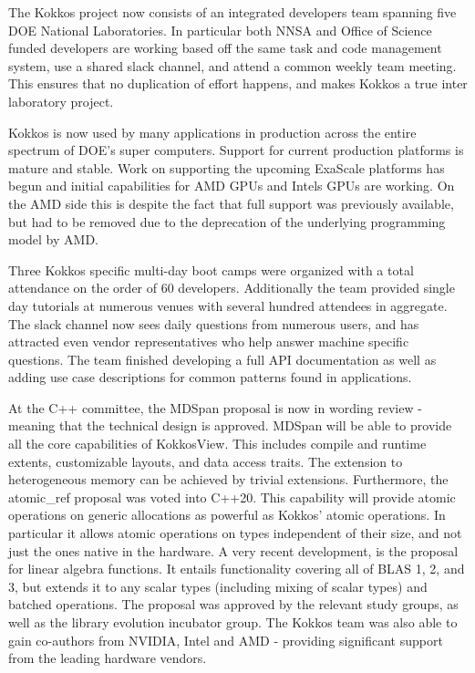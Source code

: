 The Kokkos project now consists of an integrated developers team spanning five DOE National Laboratories.
In particular both NNSA and Office of Science funded developers are working based off the same task and code management system, use a shared slack channel, and attend a common weekly team meeting.
This ensures that no duplication of effort happens, and makes Kokkos a true inter laboratory project.

Kokkos is now used by many applications in production across the entire spectrum of DOE's super computers.
Support for current production platforms is mature and stable.
Work on supporting the upcoming ExaScale platforms has begun and initial capabilities for AMD GPUs and Intels GPUs are working.
On the AMD side this is despite the fact that full support was previously available, but had to be removed due to the deprecation of the underlying programming model by AMD.

Three Kokkos specific multi-day boot camps were organized with a total attendance on the order of 60 developers.
Additionally the team provided single day tutorials at numerous venues with several hundred attendees in aggregate.
The slack channel now sees daily questions from numerous users, and has attracted even vendor representatives who help answer machine specific questions.
The team finished developing a full API documentation as well as adding use case descriptions for common patterns found in applications.

At the C++ committee, the MDSpan proposal is now in wording review - meaning that the technical design is approved. 
MDSpan will be able to provide all the core capabilities of Kokkos\:\:View.
This includes compile and runtime extents, customizable layouts, and data access traits.
The extension to heterogeneous memory can be achieved by trivial extensions. 
Furthermore, the atomic\_ref proposal was voted into C++20.
This capability will provide atomic operations on generic allocations as powerful as Kokkos' atomic operations.
In particular it allows atomic operations on types independent of their size, and not just the ones native in the hardware.
A very recent development, is the proposal for linear algebra functions.
It entails functionality covering all of BLAS 1, 2, and 3, but extends it to any scalar types (including mixing of scalar types) and batched operations.
The proposal was approved by the relevant study groups, as well as the library evolution incubator group.
The Kokkos team was also able to gain co-authors from NVIDIA, Intel and AMD - providing significant support from the leading hardware vendors.

